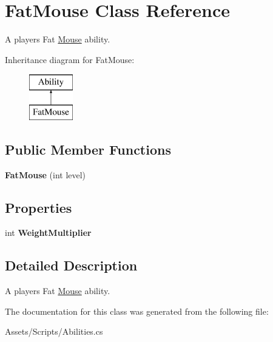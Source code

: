 \hypertarget{class_fat_mouse}{}\section{Fat\+Mouse Class Reference}
\label{class_fat_mouse}


A player\textquotesingle{}s Fat \hyperlink{class_mouse}{Mouse} ability.  


Inheritance diagram for Fat\+Mouse\+:\begin{figure}[H]
\begin{center}
\leavevmode
\includegraphics[height=2.000000cm]{class_fat_mouse}
\end{center}
\end{figure}
\subsection*{Public Member Functions}
\begin{DoxyCompactItemize}
\item 
{\bfseries Fat\+Mouse} (int level)\hypertarget{class_fat_mouse_a81bd39195a727a76c7516b875506141a}{}\label{class_fat_mouse_a81bd39195a727a76c7516b875506141a}

\end{DoxyCompactItemize}
\subsection*{Properties}
\begin{DoxyCompactItemize}
\item 
int {\bfseries Weight\+Multiplier}\hypertarget{class_fat_mouse_ab41ed59d91fcc4060339ac87e8556462}{}\label{class_fat_mouse_ab41ed59d91fcc4060339ac87e8556462}

\end{DoxyCompactItemize}


\subsection{Detailed Description}
A player\textquotesingle{}s Fat \hyperlink{class_mouse}{Mouse} ability. 



The documentation for this class was generated from the following file\+:\begin{DoxyCompactItemize}
\item 
Assets/\+Scripts/Abilities.\+cs\end{DoxyCompactItemize}
